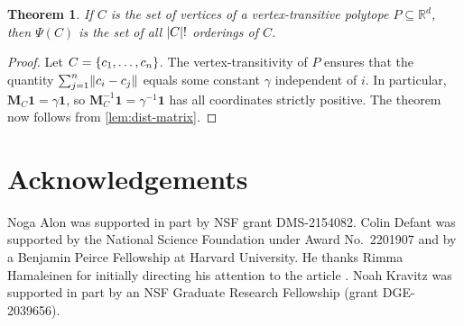 \documentclass[11pt]{amsart}
\newtheorem{theorem}{Theorem}[section]
\theoremstyle{definition}
\DeclarePairedDelimiter{\set}{\{}{\}}
\DeclarePairedDelimiter{\abs}{\lvert}{\rvert}
\DeclarePairedDelimiter{\Abs}{\lVert}{\rVert}
\newcommand{\RR}{\mathbb{R}}
\begin{document}
\begin{theorem}\label{thm:polytope}
If $C$ is the set of vertices of a vertex-transitive polytope $P \subseteq \RR^d$, then $\Psi(C)$ is the set of all $\abs{C}!$ orderings of $C$.
\end{theorem}
\begin{proof}
Let $C=\set{c_1, \ldots, c_n}$.  The vertex-transitivity of $P$ ensures that the quantity $\sum_{j=1}^n \Abs{c_i-c_j}$ equals some constant $\gamma$ independent of $i$.  In particular, ${\mathbf M}_C \mathbf{1}=\gamma{\mathbf 1}$, so ${\mathbf M}_C^{-1}{\mathbf 1}=\gamma^{-1}{\mathbf 1}$ has all coordinates strictly positive.  The theorem now follows from \cref{lem:dist-matrix}.
\end{proof}

\section*{Acknowledgements}
Noga Alon was supported in part by NSF grant DMS-2154082. Colin Defant was supported by the National Science Foundation under Award No.\ 2201907 and by a Benjamin Peirce Fellowship at Harvard University. He thanks Rimma Hamaleinen for initially directing his attention to the article \cite{Carbonero2021}.  Noah Kravitz was supported in part by an NSF Graduate Research Fellowship (grant DGE-2039656).

\printbibliography
\end{document}
